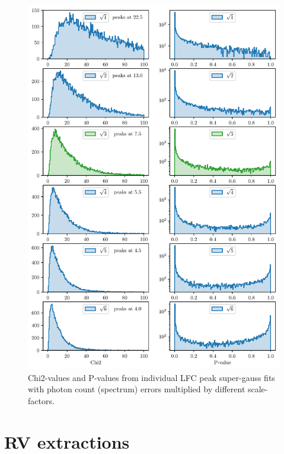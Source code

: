\begin{figure}%
    \begin{wide}  
    \includegraphics[scale=0.72]{figures/calib_errors_extensive.pdf}
    \caption{Chi2-values and P-values from individual LFC peak super-gauss fits with photon count (spectrum) errors multiplied by different scale-factors.}
    \label{fig:calib_errors_extensive}
\end{wide}
\end{figure}




% 
% 
\newpage
\section{RV extractions}\label{appendix:RV_extraction}

